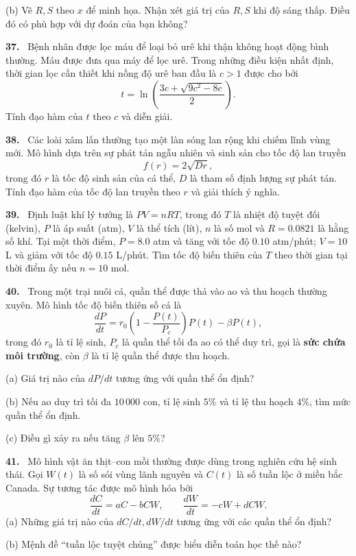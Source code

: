 \documentclass[12pt,a4paper]{article}
\newcommand{\bt}[1]{\par\smallskip\noindent\textbf{#1.}\ }
\begin{document}
(b) Vẽ $R,S$ theo $x$ để minh họa. Nhận xét giá trị của $R,S$ khi độ sáng thấp. Điều đó có phù hợp với dự đoán của bạn không?
\bt{37} Bệnh nhân được lọc máu để loại bỏ urê khi thận không hoạt động bình thường. Máu được đưa qua máy để lọc urê. Trong những điều kiện nhất định, thời gian lọc cần thiết khi nồng độ urê ban đầu là $c>1$ được cho bởi
\[t=\ln\left(\frac{3c+\sqrt{9c^2-8c}}2\right).\]
Tính đạo hàm của $t$ theo $c$ và diễn giải.
\bt{38} Các loài xâm lấn thường tạo một làn sóng lan rộng khi chiếm lĩnh vùng mới. Mô hình dựa trên sự phát tán ngẫu nhiên và sinh sản cho tốc độ lan truyền
\[f(r)=2\sqrt{Dr},\]
trong đó $r$ là tốc độ sinh sản của cá thể, $D$ là tham số định lượng sự phát tán. Tính đạo hàm của tốc độ lan truyền theo $r$ và giải thích ý nghĩa.
\bt{39} Định luật khí lý tưởng là $PV=nRT$, trong đó $T$ là nhiệt độ tuyệt đối (kelvin), $P$ là áp suất (atm), $V$ là thể tích (lít), $n$ là số mol và $R=0.0821$ là hằng số khí. Tại một thời điểm, $P=8.0$ atm và tăng với tốc độ $0.10$ atm/phút; $V=10$ L và giảm với tốc độ $0.15$ L/phút. Tìm tốc độ biến thiên của $T$ theo thời gian tại thời điểm ấy nếu $n=10$ mol.
\bt{40} Trong một trại nuôi cá, quần thể được thả vào ao và thu hoạch thường xuyên. Mô hình tốc độ biến thiên số cá là
\[\frac{dP}{dt}=r_0\left(1-\frac{P(t)}{P_c}\right)P(t)-\beta P(t),\]
trong đó $r_0$ là tỉ lệ sinh, $P_c$ là quần thể tối đa ao có thể duy trì, gọi là \textbf{sức chứa môi trường}, còn $\beta$ là tỉ lệ quần thể được thu hoạch.

(a) Giá trị nào của $dP/dt$ tương ứng với quần thể ổn định?

(b) Nếu ao duy trì tối đa $10\,000$ con, tỉ lệ sinh $5\%$ và tỉ lệ thu hoạch $4\%$, tìm mức quần thể ổn định.

(c) Điều gì xảy ra nếu tăng $\beta$ lên $5\%$?
\bt{41} Mô hình vật ăn thịt–con mồi thường được dùng trong nghiên cứu hệ sinh thái. Gọi $W(t)$ là số sói vùng lãnh nguyên và $C(t)$ là số tuần lộc ở miền bắc Canada. Sự tương tác được mô hình hóa bởi
\[\frac{dC}{dt}=aC-bCW,\qquad\frac{dW}{dt}=-cW+dCW.\]
(a) Những giá trị nào của $dC/dt,dW/dt$ tương ứng với các quần thể ổn định?

(b) Mệnh đề “tuần lộc tuyệt chủng” được biểu diễn toán học thế nào?
\end{document}
